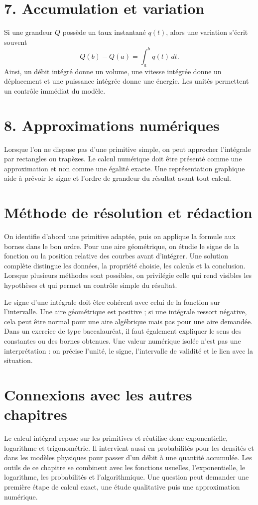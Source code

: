 \section{7. Accumulation et variation}
Si une grandeur $Q$ possède un taux instantané $q(t)$, alors une variation s’écrit souvent
\[
Q(b)-Q(a)=\int_a^b q(t)\,dt.
\]
Ainsi, un débit intégré donne un volume, une vitesse intégrée donne un déplacement et une puissance intégrée donne une énergie. Les unités permettent un contrôle immédiat du modèle.

\section{8. Approximations numériques}
Lorsque l’on ne dispose pas d’une primitive simple, on peut approcher l’intégrale par rectangles ou trapèzes. Le calcul numérique doit être présenté comme une approximation et non comme une égalité exacte. Une représentation graphique aide à prévoir le signe et l’ordre de grandeur du résultat avant tout calcul.

\section{Méthode de résolution et rédaction}
On identifie d’abord une primitive adaptée, puis on applique la formule aux bornes dans le bon ordre. Pour une aire géométrique, on étudie le signe de la fonction ou la position relative des courbes avant d’intégrer.
Une solution complète distingue les données, la propriété choisie, les calculs et la conclusion. Lorsque plusieurs méthodes sont possibles, on privilégie celle qui rend visibles les hypothèses et qui permet un contrôle simple du résultat.

Le signe d’une intégrale doit être cohérent avec celui de la fonction sur l’intervalle. Une aire géométrique est positive ; si une intégrale ressort négative, cela peut être normal pour une aire algébrique mais pas pour une aire demandée.
Dans un exercice de type baccalauréat, il faut également expliquer le sens des constantes ou des bornes obtenues. Une valeur numérique isolée n’est pas une interprétation : on précise l’unité, le signe, l’intervalle de validité et le lien avec la situation.

\section{Connexions avec les autres chapitres}
Le calcul intégral repose sur les primitives et réutilise donc exponentielle, logarithme et trigonométrie. Il intervient aussi en probabilités pour les densités et dans les modèles physiques pour passer d’un débit à une quantité accumulée.
Les outils de ce chapitre se combinent avec les fonctions usuelles, l’exponentielle, le logarithme, les probabilités et l’algorithmique. Une question peut demander une première étape de calcul exact, une étude qualitative puis une approximation numérique.

